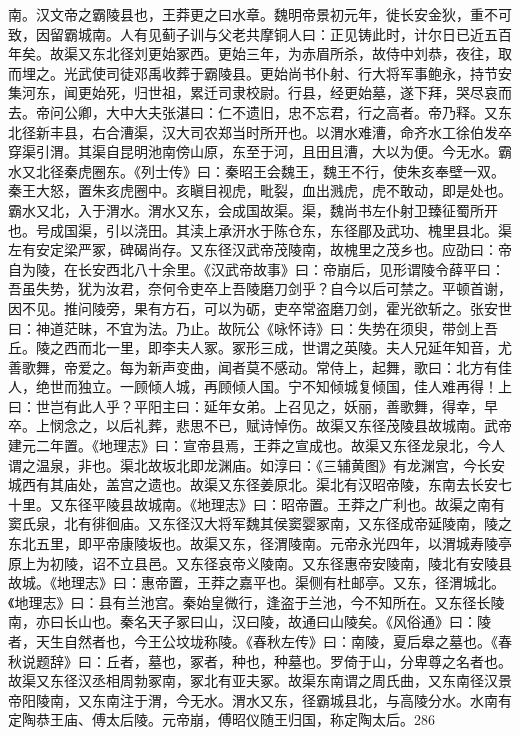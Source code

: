 \documentclass[12pt,UTF8]{ctexbook}
\begin{document}
南。汉文帝之霸陵县也，王莽更之曰水章。魏明帝景初元年，徙长安金狄，重不可致，因留霸城南。人有见蓟子训与父老共摩铜人曰：正见铸此时，计尔日已近五百年矣。故渠又东北径刘更始冢西。更始三年，为赤眉所杀，故侍中刘恭，夜往，取而埋之。光武使司徒邓禹收葬于霸陵县。更始尚书仆射、行大将军事鲍永，持节安集河东，闻更始死，归世祖，累迁司隶校尉。行县，经更始墓，遂下拜，哭尽哀而去。帝问公卿，大中大夫张湛曰：仁不遗旧，忠不忘君，行之高者。帝乃释。又东北径新丰县，右合漕渠，汉大司农郑当时所开也。以渭水难漕，命齐水工徐伯发卒穿渠引渭。其渠自昆明池南傍山原，东至于河，且田且漕，大以为便。今无水。霸水又北径秦虎圈东。《列士传》曰：秦昭王会魏王，魏王不行，使朱亥奉壁一双。秦王大怒，置朱亥虎圈中。亥瞋目视虎，毗裂，血出溅虎，虎不敢动，即是处也。霸水又北，入于渭水。渭水又东，会成国故渠。渠，魏尚书左仆射卫臻征蜀所开也。号成国渠，引以浇田。其渎上承汧水于陈仓东，东径郿及武功、槐里县北。渠左有安定梁严冢，碑碣尚存。又东径汉武帝茂陵南，故槐里之茂乡也。应劭曰：帝自为陵，在长安西北八十余里。《汉武帝故事》曰：帝崩后，见形谓陵令薛平曰：吾虽失势，犹为汝君，奈何令吏卒上吾陵磨刀剑乎？自今以后可禁之。平顿首谢，因不见。推问陵旁，果有方石，可以为砺，吏卒常盗磨刀剑，霍光欲斩之。张安世曰：神道茫昧，不宜为法。乃止。故阮公《咏怀诗》曰：失势在须臾，带剑上吾丘。陵之西而北一里，即李夫人冢。冢形三成，世谓之英陵。夫人兄延年知音，尤善歌舞，帝爱之。每为新声变曲，闻者莫不感动。常侍上，起舞，歌曰：北方有佳人，绝世而独立。一顾倾人城，再顾倾人国。宁不知倾城复倾国，佳人难再得！上曰：世岂有此人乎？平阳主曰：延年女弟。上召见之，妖丽，善歌舞，得幸，早卒。上悯念之，以后礼葬，悲思不已，赋诗悼伤。故渠又东径茂陵县故城南。武帝建元二年置。《地理志》曰：宣帝县焉，王莽之宣成也。故渠又东径龙泉北，今人谓之温泉，非也。渠北故坂北即龙渊庙。如淳曰：《三辅黄图》有龙渊宫，今长安城西有其庙处，盖宫之遗也。故渠又东径姜原北。渠北有汉昭帝陵，东南去长安七十里。又东径平陵县故城南。《地理志》曰：昭帝置。王莽之广利也。故渠之南有窦氏泉，北有徘徊庙。又东径汉大将军魏其侯窦婴冢南，又东径成帝延陵南，陵之东北五里，即平帝康陵坂也。故渠又东，径渭陵南。元帝永光四年，以渭城寿陵亭原上为初陵，诏不立县邑。又东径哀帝义陵南。又东径惠帝安陵南，陵北有安陵县故城。《地理志》曰：惠帝置，王莽之嘉平也。渠侧有杜邮亭。又东，径渭城北。《地理志》曰：县有兰池宫。秦始皇微行，逢盗于兰池，今不知所在。又东径长陵南，亦曰长山也。秦名天子冢曰山，汉曰陵，故通曰山陵矣。《风俗通》曰：陵者，天生自然者也，今王公坟垅称陵。《春秋左传》曰：南陵，夏后皋之墓也。《春秋说题辞》曰：丘者，墓也，冢者，种也，种墓也。罗倚于山，分卑尊之名者也。故渠又东径汉丞相周勃冢南，冢北有亚夫冢。故渠东南谓之周氏曲，又东南径汉景帝阳陵南，又东南注于渭，今无水。渭水又东，径霸城县北，与高陵分水。水南有定陶恭王庙、傅太后陵。元帝崩，傅昭仪随王归国，称定陶太后。286 
\end{document}
